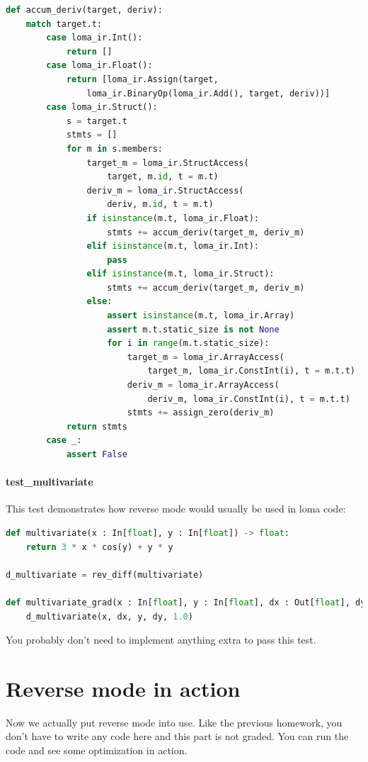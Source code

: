\begin{lstlisting}[language=Python]
def accum_deriv(target, deriv):
    match target.t:
        case loma_ir.Int():
            return []
        case loma_ir.Float():
            return [loma_ir.Assign(target,
                loma_ir.BinaryOp(loma_ir.Add(), target, deriv))]
        case loma_ir.Struct():
            s = target.t
            stmts = []
            for m in s.members:
                target_m = loma_ir.StructAccess(
                    target, m.id, t = m.t)
                deriv_m = loma_ir.StructAccess(
                    deriv, m.id, t = m.t)
                if isinstance(m.t, loma_ir.Float):
                    stmts += accum_deriv(target_m, deriv_m)
                elif isinstance(m.t, loma_ir.Int):
                    pass
                elif isinstance(m.t, loma_ir.Struct):
                    stmts += accum_deriv(target_m, deriv_m)
                else:
                    assert isinstance(m.t, loma_ir.Array)
                    assert m.t.static_size is not None
                    for i in range(m.t.static_size):
                        target_m = loma_ir.ArrayAccess(
                            target_m, loma_ir.ConstInt(i), t = m.t.t)
                        deriv_m = loma_ir.ArrayAccess(
                            deriv_m, loma_ir.ConstInt(i), t = m.t.t)
                        stmts += assign_zero(deriv_m)
            return stmts
        case _:
            assert False
\end{lstlisting}

\paragraph{test_multivariate} This test demonstrates how reverse mode would usually be used in loma code:
\begin{lstlisting}[language=Python]
def multivariate(x : In[float], y : In[float]) -> float:
    return 3 * x * cos(y) + y * y

d_multivariate = rev_diff(multivariate)

def multivariate_grad(x : In[float], y : In[float], dx : Out[float], dy : Out[float]):
    d_multivariate(x, dx, y, dy, 1.0)
\end{lstlisting}
You probably don't need to implement anything extra to pass this test.

\section{Reverse mode in action}
Now we actually put reverse mode into use. Like the previous homework, you don't have to write any code here and this part is not graded. You can run the code and see some optimization in action. 

